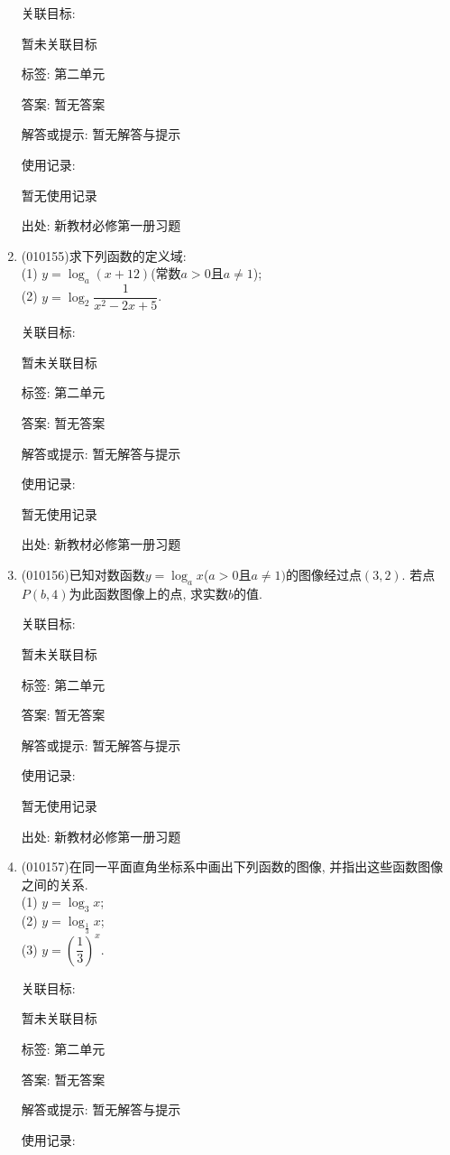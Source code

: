\documentclass[10pt,a4paper]{article}
\begin{document}
\begin{enumerate}[1.]
关联目标:

暂未关联目标



标签: 第二单元

答案: 暂无答案

解答或提示: 暂无解答与提示

使用记录:

暂无使用记录


出处: 新教材必修第一册习题
\item { (010155)}求下列函数的定义域:\\
(1) $y=\log_a (x+12)$(常数$a>0$且$a\ne 1$);\\
(2) $y=\log_2\dfrac1{x^2-2x+5}$.


关联目标:

暂未关联目标



标签: 第二单元

答案: 暂无答案

解答或提示: 暂无解答与提示

使用记录:

暂无使用记录


出处: 新教材必修第一册习题
\item { (010156)}已知对数函数$y=\log_ax$($a>0$且$a\ne 1)$的图像经过点$(3, 2)$. 若点$P(b, 4)$为此函数图像上的点, 求实数$b$的值.


关联目标:

暂未关联目标



标签: 第二单元

答案: 暂无答案

解答或提示: 暂无解答与提示

使用记录:

暂无使用记录


出处: 新教材必修第一册习题
\item { (010157)}在同一平面直角坐标系中画出下列函数的图像, 并指出这些函数图像之间的关系.\\
(1) $y=\log_3x$;\\
(2) $y=\log_{\frac 13}x$;\\
(3) $y=(\dfrac 13)^x$.


关联目标:

暂未关联目标



标签: 第二单元

答案: 暂无答案

解答或提示: 暂无解答与提示

使用记录:


\end{enumerate}
\end{document}
